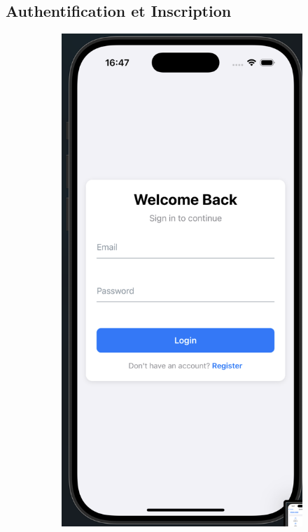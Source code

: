 \subsection{Authentification et Inscription}

\begin{figure}[H]
    \centering
    \begin{subfigure}[b]{0.48\textwidth}
        \includegraphics[width=\textwidth]{images/login page.png}

\end{subfigure}
\end{figure}
